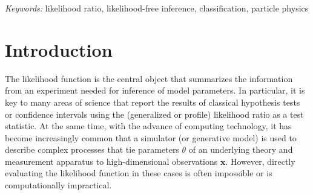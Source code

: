 \documentclass[12pt]{article}
\numberwithin{equation}{section}
\theoremstyle{plain}
\begin{document}
\noindent%
{\it Keywords:}  likelihood ratio, likelihood-free inference, classification, particle physics
\vfill

\newpage
{} %




\section{Introduction}
\label{sec:introduction}


The likelihood function is the central object that summarizes the information
from an experiment needed for inference of model parameters. In particular, it
is key to many areas of science that report the results of classical
hypothesis tests or confidence intervals using the (generalized or profile)
likelihood ratio as a test statistic. At the same time, with the advance of
computing technology, it has become increasingly common that a simulator (or
generative model) is used to describe complex processes that tie parameters
$\theta$ of an underlying theory and measurement apparatus to high-dimensional
observations $\mathbf{x}$. However, directly evaluating the likelihood function
in these cases is often impossible or is computationally impractical.
\end{document}
